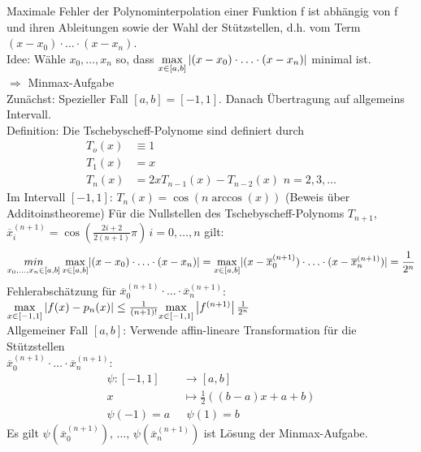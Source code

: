 Maximale Fehler der Polynominterpolation einer Funktion f ist abhängig von f und ihren
Ableitungen sowie der Wahl der Stützstellen, d.h. vom Term
$(x - x_0)\cdot \ldots \cdot(x - x_n)$. \\
Idee: Wähle $x_0, \ldots, x_n$ so, dass $\underset{x \in [a, b]}{\max} \left| (x - x_0)\cdot \ldots \cdot(x - x_n) \right|$
minimal ist. \\
$\Rightarrow$ Minmax-Aufgabe \\
Zunächst: Spezieller Fall $[a, b] = [-1, 1]$. Danach Übertragung auf allgemeins
Intervall. \\
Definition: Die Tschebyscheff-Polynome sind definiert durch
\begin{align*}
  T_o(x) &\equiv 1\\
  T_1(x) &= x\\
  T_n(x) &= 2xT_{n-1}(x) - T_{n-2}(x)\,\, n = 2, 3, \ldots
\end{align*}
Im Intervall $[-1, 1]:\,T_n(x) = \cos(n\arccos(x))$ (Beweis über Additoinstheoreme)
 Für die Nullstellen des Tschebyscheff-Polynoms $T_{n+1}$, 
$\overline{x}_i^{(n+1)} = \cos(\frac{2i + 2}{2(n + 1)}\pi)\, i = 0, \ldots, n$ gilt:
\begin{align*}
  \underset{x_0, \ldots, x_n \in [a, b]}{min} \, \underset{x \in [a, b]}{\max} |(x - x_0)
    \cdot \ldots \cdot(x - x_n)| = 
    \underset{x \in [a, b]}{\max} |(x - \overline{x}_0^{(n + 1)})\cdot \ldots 
    \cdot(x - \overline{x}_n^{(n + 1)})| =\frac{1}{2^n}
\end{align*}
Fehlerabschätzung für 
$\overline{x}_0^{(n + 1)}\cdot \ldots \cdot\overline{x}_n^{(n + 1)}$: 
$\underset{x \in [-1, 1]}{\max}\left| f(x) - p_n(x) \right| \leq \frac{1}{(n + 1)!} \underset{x \in [-1, 1]}{\max} \left| f^{(n + 1)} \right| \frac{1}{2^n}$ \\
Allgemeiner Fall $[a, b]$: Verwende affin-lineare Transformation für die Stützstellen \\
$\overline{x}_0^{(n + 1)}\cdot \ldots \cdot\overline{x}_n^{(n + 1)}$:
\begin{align*}
  \psi: [-1, 1] &\longrightarrow [a, b] \\
  x &\longmapsto \frac{1}{2}((b - a)x + a + b) \\
  \psi(-1) = a\,\,&\,\, \psi(1) = b
\end{align*}
Es gilt $\psi(\overline{x}_0^{(n + 1)}),\,\ldots,\,\psi(\overline{x}_n^{(n + 1)})$ ist
Lösung der Minmax-Aufgabe.

